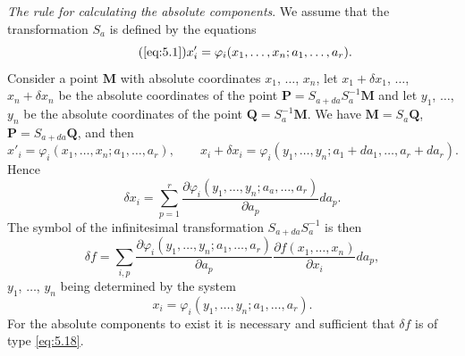 \documentclass[leqno,11pt]{book}
\makeatletter
\numberwithin{equation}{chapter}
\newcommand{\pd}{\partial}
\theoremstyle{shape1}
\theoremstyle{shapesmall}
\let\old@phi\phi
\let\old@varphi\varphi
\let\phi\old@varphi
\let\varphi\old@phi
\newcommand{\somespace}{\vspace{9pt}}
\makeatother
\begin{document}
\somespace

\emph{The rule for calculating the absolute components}. We assume that the transformation $S_{a}$ is defined by the equations
\begin{equation}
  \label{eq:5.1''}\tag{\ref{eq:5.1}}
  x'_{i}=\phi_{i}(x_{1},\dots,x_{n};a_{1},\dots,a_{r}).
\end{equation}
Consider a point $\mathbf{M}$ with absolute coordinates $x_{1}$, $\dots$, $x_{n}$, let $x_{1}+\delta x_{1}$, $\dots$, $x_{n}+\delta x_{n}$ be the absolute coordinates of the point $\mathbf{P}=S_{a+da}S_{a}^{-1}\mathbf{M}$ and let $y_{1}$, $\dots$, $y_{n}$ be the absolute coordinates of the point $\mathbf{Q}=S_{a}^{-1}\mathbf{M}$. We have $\mathbf{M}=S_{a}\mathbf{Q}$, $\mathbf{P}=S_{a+da}\mathbf{Q}$, and then
\[
x'_{i}=\phi_{i}(x_{1},\dots,x_{n};a_{1},\dots,a_{r}),\qquad
x_{i}+\delta x_{i}=\phi_{i}(y_{1},\dots,y_{n};a_{1}+da_{1},\dots,a_{r}+da_{r}).
\]
Hence
\[
\delta x_{i}=\sum_{p=1}^{r}\frac{\pd \phi_{i}(y_{1},\dots,y_{n};a_{a},\dots,a_{r})}{\pd a_{p}}da_{p}.
\]
The symbol of the infinitesimal transformation $S_{a+da}S_{a}^{-1}$ is then
\begin{equation}
  \label{eq:5.19}
  \delta f=\sum_{i,p}\frac{\pd\phi_{i}(y_{1},\dots,y_{n};a_{1},\dots,a_{r})}{\pd a_{p}}\frac{\pd f(x_{1},\dots,x_{n})}{\pd x_{i}}da_{p},
\end{equation}
$y_{1}$, $\dots$, $y_{n}$ being determined by the system
\begin{equation}
  \label{eq:5.20}
  x_{i}=\phi_{i}(y_{1},\dots,y_{n};a_{1},\dots,a_{r}).
\end{equation}
For the absolute components to exist it is necessary and sufficient that $\delta f$ is of type \eqref{eq:5.18}.

\somespace
\end{document}
